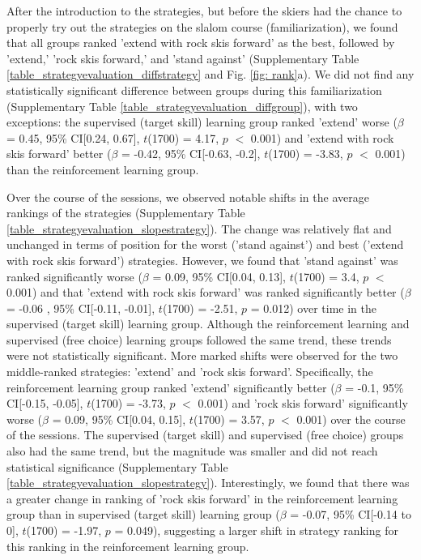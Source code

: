 \documentclass[pdflatex,sn-nature]{sn-jnl}%
\theoremstyle{thmstyleone}%
\theoremstyle{thmstyletwo}%
\theoremstyle{thmstylethree}%
\begin{document}
After the introduction to the strategies, but before the skiers had the chance to properly try out the strategies on the slalom course (familiarization), we found that all groups ranked 'extend with rock skis forward' as the best, followed by 'extend,' 'rock skis forward,' and 'stand against' (Supplementary Table \ref{table_strategyevaluation_diffstrategy} and Fig. \ref{fig: rank}a). We did not find any statistically significant difference between groups during this familiarization (Supplementary Table \ref{table_strategyevaluation_diffgroup}), with two exceptions: the supervised (target skill) learning group ranked 'extend' worse ($\beta$ = 0.45, 95\% CI[0.24,  0.67], $t$(1700) = 4.17, $p$ $<$ 0.001) and 'extend with rock skis forward' better  ($\beta$ = -0.42, 95\% CI[-0.63, -0.2], $t$(1700) = -3.83, $p$ $<$ 0.001) than the reinforcement learning group.

Over the course of the sessions, we observed notable shifts in the average rankings of the strategies (Supplementary Table \ref{table_strategyevaluation_slopestrategy}). The change was relatively flat and unchanged in terms of position for the worst ('stand against') and best ('extend with rock skis forward') strategies. However, we found that 'stand against' was ranked significantly worse ($\beta$ = 0.09, 95\% CI[0.04, 0.13], $t$(1700) = 3.4, $p$ $<$ 0.001)  and that 'extend with rock skis forward' was ranked significantly better ($\beta$ = -0.06 , 95\% CI[-0.11, -0.01], $t$(1700) = -2.51, $p$ = 0.012) over time in the supervised (target skill) learning group. Although the reinforcement learning and supervised (free choice) learning groups followed the same trend, these trends were not statistically significant. More marked shifts were observed for the two middle-ranked strategies: 'extend' and 'rock skis forward'. Specifically, the reinforcement learning group ranked 'extend' significantly better  ($\beta$ = -0.1, 95\% CI[-0.15, -0.05], $t$(1700) = -3.73, $p$ $<$ 0.001) and 'rock skis forward' significantly worse ($\beta$ = 0.09, 95\% CI[0.04, 0.15], $t$(1700) = 3.57, $p$ $<$ 0.001) over the course of the sessions. The supervised (target skill) and supervised (free choice) groups also had the same trend, but the magnitude was smaller and did not reach statistical significance (Supplementary Table \ref{table_strategyevaluation_slopestrategy}). Interestingly, we found that there was a greater change in ranking of 'rock skis forward' in the reinforcement learning group than in supervised (target skill) learning group ($\beta$ = -0.07, 95\% CI[-0.14 to 0], $t$(1700) = -1.97, $p$ = 0.049), suggesting a larger shift in strategy ranking for this ranking in the reinforcement learning group. 
\end{document}
